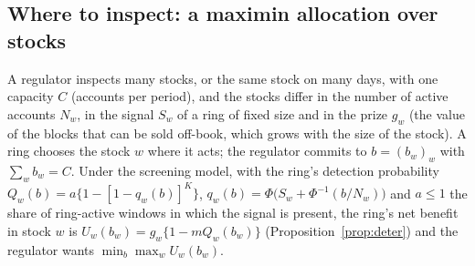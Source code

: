 \subsection{Where to inspect: a maximin allocation over stocks}\label{sec:alloc}

A regulator inspects many stocks, or the same stock on many days, with one capacity $C$ (accounts per period), and the stocks differ in the number of active accounts $N_w$, in the signal $S_w$ of a ring of fixed size and in the prize $g_w$ (the value of the blocks that can be sold off-book, which grows with the size of the stock). A ring chooses the stock $w$ where it acts; the regulator commits to $b=(b_w)_w$ with $\sum_wb_w=C$. Under the screening model, with the ring's detection probability $Q_w(b)=a\{1-[1-q_w(b)]^K\}$, $q_w(b)=\Phi\bigl(S_w+\Phi^{-1}(b/N_w)\bigr)$ and $a\le1$ the share of ring-active windows in which the signal is present, the ring's net benefit in stock $w$ is $U_w(b_w)=g_w\{1-mQ_w(b_w)\}$ (Proposition~\ref{prop:deter}) and the regulator wants $\min_b\max_wU_w(b_w)$.


